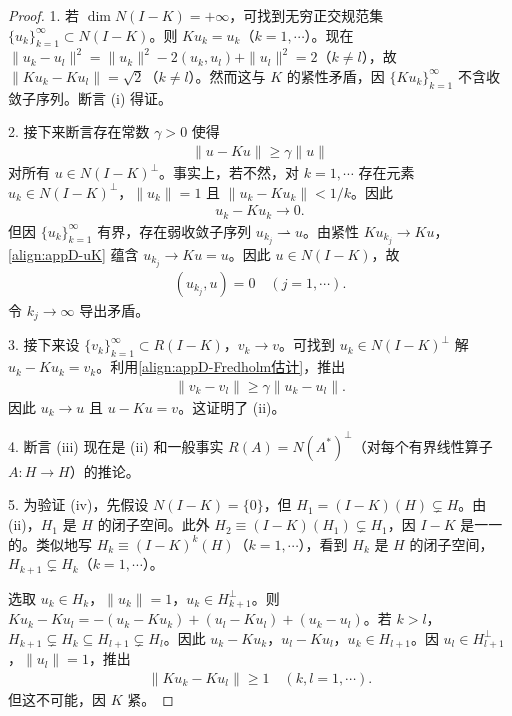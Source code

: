 \documentclass[../main.tex]{subfiles}
\begin{document}
\begin{proof}
1. 若 $\dim N(I-K)=+\infty$，可找到无穷正交规范集 $\{u_k\}_{k=1}^\infty\subset N(I-K)$。则 $Ku_k=u_k$（$k=1,\cdots$）。现在 $\|u_k-u_l\|^2=\|u_k\|^2-2(u_k,u_l)+\|u_l\|^2=2$（$k\neq l$），故 $\|Ku_k-Ku_l\|=\sqrt{2}$（$k\neq l$）。然而这与 $K$ 的紧性矛盾，因 $\{Ku_k\}_{k=1}^\infty$ 不含收敛子序列。断言 (i) 得证。

2. 接下来断言存在常数 $\gamma>0$ 使得
\begin{align}
\|u-Ku\|\geqslant\gamma\|u\|
\label{align:appD-Fredholm估计}
\end{align}
对所有 $u\in N(I-K)^\perp$。事实上，若不然，对 $k=1,\cdots$ 存在元素 $u_k\in N(I-K)^\perp$，$\|u_k\|=1$ 且 $\|u_k-Ku_k\|<1/k$。因此
\begin{align}
u_k-Ku_k\to 0.
\label{align:appD-uK}
\end{align}
但因 $\{u_k\}_{k=1}^\infty$ 有界，存在弱收敛子序列 $u_{k_j}\rightharpoonup u$。由紧性 $Ku_{k_j}\to Ku$，\eqref{align:appD-uK} 蕴含 $u_{k_j}\to Ku=u$。因此 $u\in N(I-K)$，故
\begin{align*}
(u_{k_j},u)=0 \quad (j=1,\cdots).
\end{align*}
令 $k_j\to\infty$ 导出矛盾。

3. 接下来设 $\{v_k\}_{k=1}^\infty\subset R(I-K)$，$v_k\to v$。可找到 $u_k\in N(I-K)^\perp$ 解 $u_k-Ku_k=v_k$。利用\eqref{align:appD-Fredholm估计}，推出
\begin{align*}
\|v_k-v_l\|\geqslant\gamma\|u_k-u_l\|.
\end{align*}
因此 $u_k\to u$ 且 $u-Ku=v$。这证明了 (ii)。

4. 断言 (iii) 现在是 (ii) 和一般事实 $R(A)=N(A^*)^\perp$（对每个有界线性算子 $A:H\to H$）的推论。

5. 为验证 (iv)，先假设 $N(I-K)=\{0\}$，但 $H_1=(I-K)(H)\subsetneq H$。由 (ii)，$H_1$ 是 $H$ 的闭子空间。此外 $H_2\equiv(I-K)(H_1)\subsetneq H_1$，因 $I-K$ 是一一的。类似地写 $H_k\equiv(I-K)^k(H)$（$k=1,\cdots$），看到 $H_k$ 是 $H$ 的闭子空间，$H_{k+1}\subsetneq H_k$（$k=1,\cdots$）。

选取 $u_k\in H_k$，$\|u_k\|=1$，$u_k\in H_{k+1}^\perp$。则 $Ku_k-Ku_l=-(u_k-Ku_k)+(u_l-Ku_l)+(u_k-u_l)$。若 $k>l$，$H_{k+1}\subsetneq H_k\subseteq H_{l+1}\subsetneq H_l$。因此 $u_k-Ku_k$，$u_l-Ku_l$，$u_k\in H_{l+1}$。因 $u_l\in H_{l+1}^\perp$，$\|u_l\|=1$，推出
\begin{align*}
\|Ku_k-Ku_l\|\geqslant 1 \quad (k,l=1,\cdots).
\end{align*}
但这不可能，因 $K$ 紧。


\end{proof}
\end{document}
